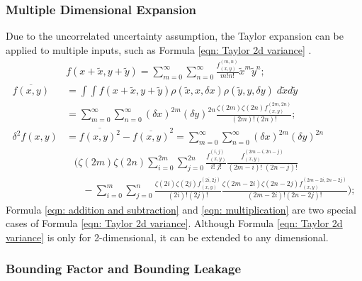 \documentclass[twoside]{article}
\numberwithin{equation}{section}
\newcommand{\eqspace}{\;\;\;}
\begin{document}
\subsubsection{Multiple Dimensional Expansion}

Due to the uncorrelated uncertainty assumption, the Taylor expansion can be applied to multiple inputs, such as Formula \eqref{eqn: Taylor 2d variance} \cite{Prev_Precision_Arithmetic} .
\begin{align}
\label{eqn: Taylor 2d}
&f(x + \tilde{x}, y + \tilde{y}) = \sum_{m=0}^{\infty} \sum_{n=0}^{\infty} \frac{f^{(m,n)}_{(x,y)}}{m! n!} \tilde{x}^m \tilde{y}^n; \\
\label{eqn: Taylor 2d mean}
\overline{f(x,y)} &= \int \int f(x + \tilde{x}, y + \tilde{y}) \rho(\tilde{x}, x, \delta x) \rho(\tilde{y}, y, \delta y)\; d \tilde{x} d \tilde{y} \\
&= \sum_{m=0}^{\infty} \sum_{n=0}^{\infty} (\delta x)^{2m} (\delta y)^{2n}  \frac{\zeta(2m) \zeta(2n) f^{(2m,2n)}_{(x,y)}}{(2m)! (2n)!}; \nonumber \\
\label{eqn: Taylor 2d variance}
\delta^2 f(x, y) &= \overline{f(x, y)^2} - \overline{f(x, y)}^2 = \sum_{m=0}^{\infty} \sum_{n=0}^{\infty} (\delta x)^{2m} (\delta y)^{2n} \\
&\eqspace (\zeta(2m) \zeta(2n) \sum_{i=0}^{2m} \sum_{j=0}^{2n} \frac{f^{(i,j)}_{(x,y)}}{i!\;j!}\frac{f^{(2m-i,2n-j)}_{(x,y)}}{(2m-i)!\;(2n-j)!} \nonumber \\
&\eqspace\eqspace - \sum_{i=0}^{m} \sum_{j=0}^{n} \frac{\zeta(2i) \zeta(2j) f^{(2i,2j)}_{(x,y)}}{(2i)!(2j)!}
	\frac{\zeta(2m-2i) \zeta(2n-2j) f^{(2m-2i,2n-2j)}_{(x,y)}}{(2m-2i)!(2n-2j)!}); \nonumber
\end{align}
Formula \eqref{eqn: addition and subtraction} and \eqref{eqn: multiplication} are two special cases of Formula \eqref{eqn: Taylor 2d variance}.
Although Formula \eqref{eqn: Taylor 2d variance} is only for 2-dimensional, it can be extended to any dimensional.



\subsubsection{Bounding Factor and Bounding Leakage}
\end{document}
